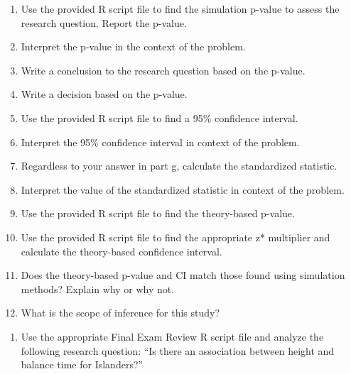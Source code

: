 \documentclass[
]{report}
\providecommand{\tightlist}{%
  \setlength{\itemsep}{0pt}\setlength{\parskip}{0pt}}
\begin{document}
\vspace{0.8in}

\begin{enumerate}
\def\labelenumi{\alph{enumi}.}
\setcounter{enumi}{7}
\item
  Use the provided R script file to find the simulation p-value to assess the research question. Report the p-value.
  \vspace{0.3in}
\item
  Interpret the p-value in the context of the problem.
  \vspace{0.8in}
\item
  Write a conclusion to the research question based on the p-value.
  \vspace{0.8in}
\item
  Write a decision based on the p-value.
  \vspace{0.3in}
\item
  Use the provided R script file to find a 95\% confidence interval.
  \vspace{0.3in}
\item
  Interpret the 95\% confidence interval in context of the problem.
  \vspace{0.8in}
\item
  Regardless to your answer in part g, calculate the standardized statistic.
  \vspace{0.4in}
\item
  Interpret the value of the standardized statistic in context of the problem.
  \vspace{0.8in}
\item
  Use the provided R script file to find the theory-based p-value.
  \vspace{0.3in}
\item
  Use the provided R script file to find the appropriate z* multiplier and calculate the theory-based confidence interval.
  \vspace{0.5in}
\item
  Does the theory-based p-value and CI match those found using simulation methods? Explain why or why not.
  \vspace{0.8in}
\item
  What is the scope of inference for this study?
  \vspace{0.8in}
\end{enumerate}

\begin{enumerate}
\def\labelenumi{\arabic{enumi}.}
\setcounter{enumi}{2}
\tightlist
\item
  Use the appropriate Final Exam Review R script file and analyze the following research question: ``Is there an association between height and balance time for Islanders?''
\end{enumerate}
\end{document}
